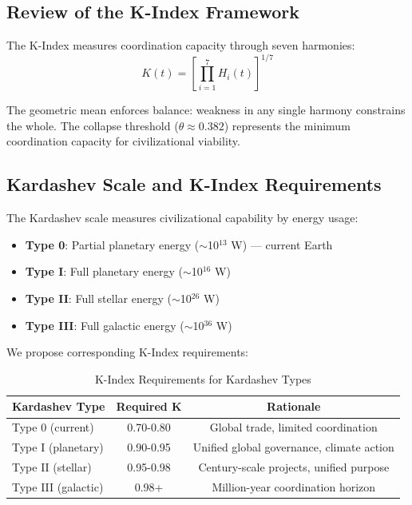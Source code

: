 \documentclass[11pt,a4paper]{article}
\begin{document}
\subsection{Review of the K-Index Framework}

The K-Index measures coordination capacity through seven harmonies:
\begin{equation}
K(t) = \left[ \prod_{i=1}^{7} H_i(t) \right]^{1/7}
\end{equation}

The geometric mean enforces balance: weakness in any single harmony constrains the whole. The collapse threshold ($\theta \approx 0.382$) represents the minimum coordination capacity for civilizational viability.

\subsection{Kardashev Scale and K-Index Requirements}

The Kardashev scale measures civilizational capability by energy usage:
\begin{itemize}
    \item \textbf{Type 0}: Partial planetary energy ($\sim$10$^{13}$ W) --- current Earth
    \item \textbf{Type I}: Full planetary energy ($\sim$10$^{16}$ W)
    \item \textbf{Type II}: Full stellar energy ($\sim$10$^{26}$ W)
    \item \textbf{Type III}: Full galactic energy ($\sim$10$^{36}$ W)
\end{itemize}

We propose corresponding K-Index requirements:

\begin{table}[h]
\centering
\begin{tabular}{lcc}
\toprule
\textbf{Kardashev Type} & \textbf{Required K} & \textbf{Rationale} \\
\midrule
Type 0 (current) & 0.70-0.80 & Global trade, limited coordination \\
Type I (planetary) & 0.90-0.95 & Unified global governance, climate action \\
Type II (stellar) & 0.95-0.98 & Century-scale projects, unified purpose \\
Type III (galactic) & 0.98+ & Million-year coordination horizon \\
\bottomrule
\end{tabular}
\caption{K-Index Requirements for Kardashev Types}
\end{table}
\end{document}
